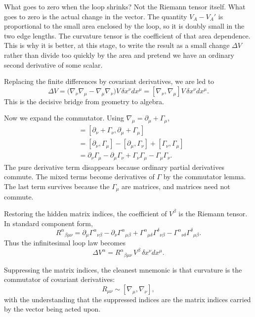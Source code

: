 What goes to zero when the loop shrinks? Not the Riemann tensor itself. What goes to zero is the actual change in the vector. The quantity \(V_A-V_A'\) is proportional to the small area enclosed by the loop, so it is doubly small in the two edge lengths. The curvature tensor is the coefficient of that area dependence. This is why it is better, at this stage, to write the result as a small change \(\Delta V\) rather than divide too quickly by the area and pretend we have an ordinary second derivative of some scalar.

Replacing the finite differences by covariant derivatives, we are led to
\begin{equation}
\Delta V
=
\big(\nabla_\nu\nabla_\mu - \nabla_\mu\nabla_\nu\big)V\,
\delta x^\nu dx^\mu
=
[\nabla_\nu,\nabla_\mu]V\,\delta x^\nu dx^\mu.
\end{equation}
This is the decisive bridge from geometry to algebra.

Now we expand the commutator. Using \(\nabla_\mu=\partial_\mu+\Gamma_\mu\),
\begin{align}
[\nabla_\nu,\nabla_\mu]
&=
[\partial_\nu+\Gamma_\nu,\partial_\mu+\Gamma_\mu] \\
&=
[\partial_\nu,\Gamma_\mu]-[\partial_\mu,\Gamma_\nu]+[\Gamma_\nu,\Gamma_\mu] \\
&=
\partial_\nu\Gamma_\mu-\partial_\mu\Gamma_\nu+\Gamma_\nu\Gamma_\mu-\Gamma_\mu\Gamma_\nu.
\end{align}
The pure derivative term disappears because ordinary partial derivatives commute. The mixed terms become derivatives of \(\Gamma\) by the commutator lemma. The last term survives because the \(\Gamma_\mu\) are matrices, and matrices need not commute.

Restoring the hidden matrix indices, the coefficient of \(V^\beta\) is the Riemann tensor. In standard component form,
\begin{equation}
R^\alpha{}_{\beta\mu\nu}
=
\partial_\mu \Gamma^\alpha{}_{\nu\beta}
-
\partial_\nu \Gamma^\alpha{}_{\mu\beta}
+
\Gamma^\alpha{}_{\mu\delta}\Gamma^\delta{}_{\nu\beta}
-
\Gamma^\alpha{}_{\nu\delta}\Gamma^\delta{}_{\mu\beta}.
\end{equation}
Thus the infinitesimal loop law becomes
\begin{equation}
\Delta V^\alpha
=
R^\alpha{}_{\beta\mu\nu}\,V^\beta\,\delta x^\nu dx^\mu.
\end{equation}

Suppressing the matrix indices, the cleanest mnemonic is that curvature is the commutator of covariant derivatives:
\begin{equation}
R_{\mu\nu}\sim[\nabla_\mu,\nabla_\nu],
\end{equation}
with the understanding that the suppressed indices are the matrix indices carried by the vector being acted upon.

